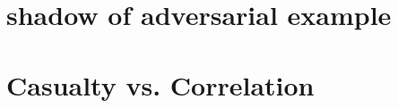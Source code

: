 \section{shadow of adversarial example}\label{sec:adversarial}
\section{Casualty vs. Correlation}\label{sec:Causualty}

